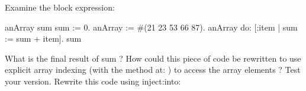 \newpage
\exercise Examine the block expression:

\begin{code}
\ttt{|} anArray sum \ttt{|}
sum := 0.
anArray := #(21 23 53 66 87).
anArray do: [:item | sum := sum + item].
sum
\end{code}

What is the final result of sum ?
How could this piece of code be rewritten to use explicit array indexing (with the method at: ) to access the array elements ? Test your version.
Rewrite this code using inject:into:


\ifx\wholebook\relax\else\fi
